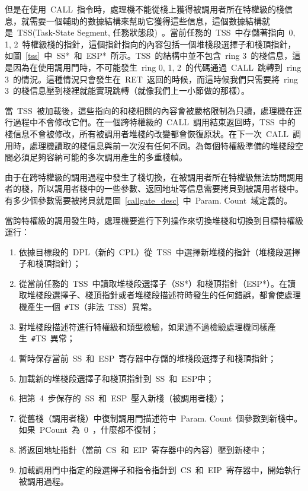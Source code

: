 
但是在使用~CALL~指令時，處理機不能從棧上獲得被調用者所在特權級的棧信息，就需要一個輔助的數據結構來幫助它獲得這些信息，這個數據結構就是~TSS(Task-State Segment, 任務狀態段)~。當前任務的~TSS~中存儲著指向~0, 1, 2~特權級棧的指針，這個指針指向的內容包括一個堆棧段選擇子和棧頂指針，如圖~\ref{tss}~中~SS*~和~ESP*~所示。TSS~的結構中並不包含~ring 3~的棧信息，這是因為在使用調用門時，不可能發生~ring 0, 1, 2~的代碼通過~CALL~跳轉到~ring 3~的情況。這種情況只會發生在~RET~返回的時候，而這時候我們只需要將~ring 3~的棧信息壓到棧裡就能實現跳轉（就像我們上一小節做的那樣）。

當~TSS~被加載後，這些指向的和棧相關的內容會被嚴格限制為只讀，處理機在運行過程中不會修改它們。在一個跨特權級的~CALL~調用結束返回時，TSS~中的棧信息不會被修改，所有被調用者堆棧的改變都會恢復原狀。在下一次~CALL~調用時，處理機讀取的棧信息與前一次沒有任何不同。為每個特權級準備的堆棧段空間必須足夠容納可能的多次調用產生的多重棧幀。

由于在跨特權級的調用過程中發生了棧切換，在被調用者所在特權級無法訪問調用者的棧，所以調用者棧中的一些參數、返回地址等信息需要拷貝到被調用者棧中。有多少個參數需要被拷貝就是圖~\ref{callgate_desc}~中~Param. Count~域定義的。

當跨特權級的調用發生時，處理機要進行下列操作來切換堆棧和切換到目標特權級運行：

\begin{enumerate}
\item 依據目標段的~DPL（新的~CPL）從~TSS~中選擇新堆棧的指針（堆棧段選擇子和棧頂指針）；
\item 從當前任務的~TSS~中讀取堆棧段選擇子（SS*）和棧頂指針（ESP*）。在讀取堆棧段選擇子、棧頂指針或者堆棧段描述符時發生的任何錯誤，都會使處理機產生一個~\texttt{\#}TS（非法~TSS）異常。
\item 對堆棧段描述符進行特權級和類型檢驗，如果通不過檢驗處理機同樣產生~\texttt{\#}TS~異常；
\item 暫時保存當前~SS~和~ESP~寄存器中存儲的堆棧段選擇子和棧頂指針；
\item 加載新的堆棧段選擇子和棧頂指針到~SS~和~ESP中；
\item 把第~4~步保存的~SS~和~ESP~壓入新棧（被調用者棧）；
\item 從舊棧（調用者棧）中復制調用門描述符中~Param. Count~個參數到新棧中。如果~PCount~為~0~，什麼都不復制；
\item 將返回地址指針（當前~CS~和~EIP~寄存器中的內容）壓到新棧中；
\item 加載調用門中指定的段選擇子和指令指針到~CS~和~EIP~寄存器中，開始執行被調用過程。
\end{enumerate}

